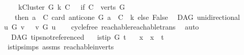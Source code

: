 \begin{isabellebody}
\ \ \ \ {\isachardoublequoteopen}kCluster\ G\ k\ C\ {\isacharequal}{\kern0pt}\ \ {\isacharparenleft}{\kern0pt}if\ {\isacharparenleft}{\kern0pt}C\ {\isasymsubseteq}\ {\isacharparenleft}{\kern0pt}verts\ G{\isacharparenright}{\kern0pt}{\isacharparenright}{\kern0pt}\isanewline
\ \ \ then\ {\isacharparenleft}{\kern0pt}{\isasymforall}a\ {\isasymin}\ C{\isachardot}{\kern0pt}\ card\ {\isacharparenleft}{\kern0pt}{\isacharparenleft}{\kern0pt}anticone\ G\ a{\isacharparenright}{\kern0pt}\ {\isasyminter}\ C{\isacharparenright}{\kern0pt}\ {\isasymle}\ k{\isacharparenright}{\kern0pt}\ else\ False{\isacharparenright}{\kern0pt}{\isachardoublequoteclose}%
\isadelimdocument
%
\endisadelimdocument
%
\isatagdocument
%
\isamarkuptrue%
%
\endisatagdocument
{\isafolddocument}%
%
\isadelimdocument
%
\endisadelimdocument
{}\isamarkupfalse%
\ {\isacharparenleft}{\kern0pt}\ DAG{\isacharparenright}{\kern0pt}\ unidirectional{\isacharcolon}{\kern0pt}\isanewline
{\isachardoublequoteopen}u\ {\isasymrightarrow}\isactrlsup {\isacharplus}{\kern0pt}\isactrlbsub G\isactrlesub \ v\ {\isasymlongrightarrow}\ {\isasymnot}{\isacharparenleft}{\kern0pt}\ v\ {\isasymrightarrow}\isactrlsup {\isacharasterisk}{\kern0pt}\isactrlbsub G\isactrlesub \ u{\isacharparenright}{\kern0pt}{\isachardoublequoteclose}\isanewline
%
\isadelimproof
\ \ %
\endisadelimproof
%
\isatagproof
{}\isamarkupfalse%
\ cycle{\isacharunderscore}{\kern0pt}free\ reachable{}{\isacharunderscore}{\kern0pt}reachable{\isacharunderscore}{\kern0pt}trans\ \isamarkupfalse%
\ auto%
\endisatagproof
{\isafoldproof}%
%
\isadelimproof
%
\endisadelimproof
%
\isadelimdocument
%
\endisadelimdocument
%
\isatagdocument
%
\isamarkuptrue%
%
\endisatagdocument
{\isafolddocument}%
%
\isadelimdocument
%
\endisadelimdocument
{}\isamarkupfalse%
\ {\isacharparenleft}{\kern0pt}\ DAG{\isacharparenright}{\kern0pt}\ tips{\isacharunderscore}{\kern0pt}not{\isacharunderscore}{\kern0pt}referenced{\isacharcolon}{\kern0pt}\isanewline
\ \ \ {\isachardoublequoteopen}is{\isacharunderscore}{\kern0pt}tip\ G\ t{\isachardoublequoteclose}\isanewline
\ \ \ {\isachardoublequoteopen}{\isasymforall}x{\isachardot}{\kern0pt}\ {\isasymnot}\ x\ {\isasymrightarrow}\isactrlsup {\isacharplus}{\kern0pt}\ t{\isachardoublequoteclose}\isanewline
%
\isadelimproof
\ \ %
\endisadelimproof
%
\isatagproof
{}\isamarkupfalse%
\ is{\isacharunderscore}{\kern0pt}tip{\isachardot}{\kern0pt}simps\ assms\ reachable{}{\isacharunderscore}{\kern0pt}in{\isacharunderscore}{\kern0pt}verts{\isacharparenleft}{\kern0pt}{}{\isacharparenright}{\kern0pt}\isanewline

\end{isabellebody}
